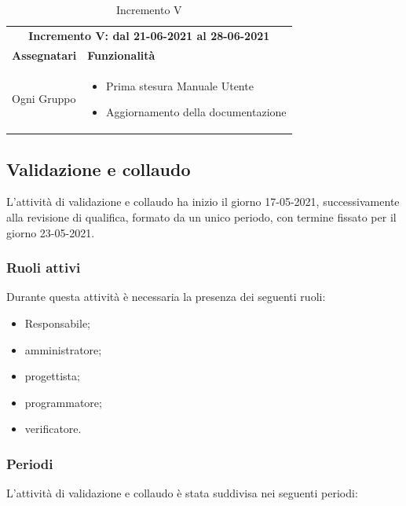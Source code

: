 \begin{table} [h!]
	\begin{center}
		\begin{tabular} { m{4cm}  m{11cm}  }	
			\multicolumn{2}{c}{	\textbf{Incremento V: dal 21-06-2021 al 28-06-2021}} \\
			\rowcolor{lightgray}
			\textbf{Assegnatari} & \textbf{Funzionalità} \\
				Ogni Gruppo & \begin{itemize}
				\item Prima stesura Manuale Utente
				\item Aggiornamento della documentazione
			\end{itemize}\\		
			
		\end{tabular}
		\caption{Incremento V}
	\end{center}
\end{table}

\subsection{Validazione e collaudo}
L'attività di validazione e collaudo ha inizio il giorno 17-05-2021, successivamente alla revisione di qualifica, formato da un unico periodo, con termine fissato per il giorno 23-05-2021.

\subsubsection{Ruoli attivi}
Durante questa attività è necessaria la presenza dei seguenti ruoli:
\begin{itemize}
	\item Responsabile;
	\item amministratore;
	\item progettista;
	\item programmatore;
	\item verificatore.
\end{itemize}
\subsubsection{Periodi}
L'attività di validazione e collaudo è stata suddivisa nei seguenti periodi:

